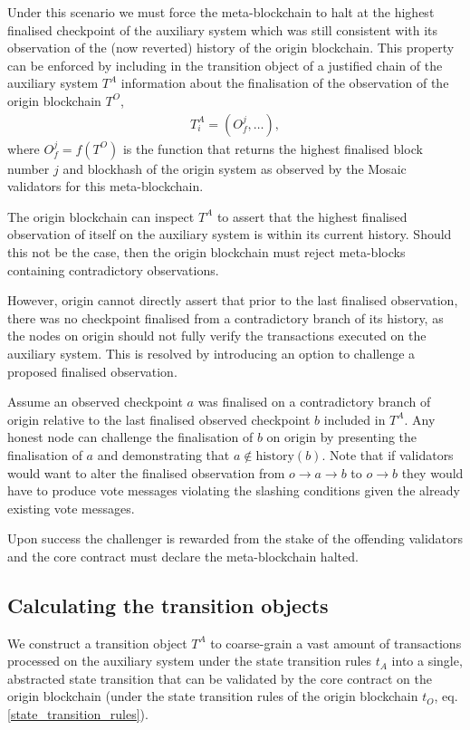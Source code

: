 \documentclass[12pt,a4paper]{article}
\begin{document}
Under this scenario we must force the meta-blockchain to halt at the highest finalised checkpoint of the auxiliary system which was still consistent with its observation of the (now reverted) history of the origin blockchain.
This property can be enforced by including in the transition object of a justified chain of the auxiliary system $T^A$ information about the finalisation of the observation of the origin blockchain $T^O$,
\begin{align*}
  T^A_i = (O^j_f, \dots),
\end{align*}
where $O^j_f = f(T^O)$ is the function that returns the highest finalised block number $j$ and blockhash of the origin system as observed by the Mosaic validators for this meta-blockchain.

The origin blockchain can inspect $T^A$ to assert that the highest finalised observation of itself on the auxiliary system is within its current history.
Should this not be the case, then the origin blockchain must reject meta-blocks containing contradictory observations.

However, origin cannot directly assert that prior to the last finalised observation, there was no checkpoint finalised from a contradictory branch of its history, as the nodes on origin should not fully verify the transactions executed on the auxiliary system.
This is resolved by introducing an option to challenge a proposed finalised observation.

Assume an observed checkpoint $a$ was finalised on a contradictory branch of origin relative to the last finalised observed checkpoint $b$ included in $T^A$.
Any honest node can challenge the finalisation of $b$ on origin by presenting the finalisation of $a$ and demonstrating that $a \notin \text{history}(b)$.
Note that if validators would want to alter the finalised observation from $o \rightarrow a \rightarrow b$ to $o \rightarrow b$ they would have to produce vote messages violating the slashing conditions given the already existing vote messages.

Upon success the challenger is rewarded from the stake of the offending validators and the core contract must declare the meta-blockchain halted.

\subsection{Calculating the transition objects}

We construct a transition object $T^A$ to coarse-grain a vast amount of transactions processed on the auxiliary system under the state transition rules $t_A$ into a single, abstracted state transition that can be validated by the core contract on the origin blockchain (under the state transition rules of the origin blockchain $t_O$, eq. \ref{state_transition_rules}).
\end{document}
